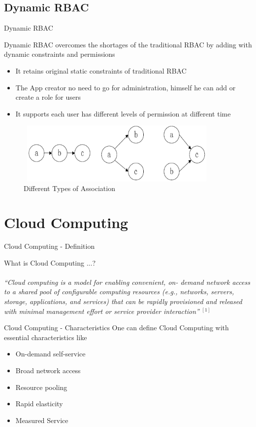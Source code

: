 \documentclass[xcolor=dvipsnames]{beamer}
\begin{document}
\subsection{Dynamic RBAC}
\begin{frame}{Dynamic RBAC}


Dynamic RBAC overcomes the shortages of the traditional RBAC by adding with dynamic constraints and  permissions
\begin{itemize}
 \item It retains original static constraints of traditional RBAC
 \item The App creator no need to go for administration, himself he can add or create a role for users
 \item It supports each user has different levels of permission at different time
\end{itemize}
\begin{figure}[H]
\includegraphics[width=10cm,height=3cm]{ass}
\caption{Different Types of Association}
\end{figure}
\end{frame}
\section{Cloud Computing}
\begin{frame}{Cloud Computing - Definition }

What is Cloud Computing ...? \\
\hspace{4cm} \\
\textit{``Cloud computing is a model for enabling convenient, on-
demand network access to a shared pool of configurable
computing resources (e.g., networks, servers, storage,
applications, and services) that can be rapidly provisioned
and released with minimal management effort or service
provider interaction''} $ ^{[1]} $

\end{frame}

\begin{frame} {Cloud Computing - Characteristics }
One can define Cloud Computing with essential characteristics like

\begin{itemize}
\item On-demand self-service
\item Broad network access
\item Resource pooling
\item Rapid elasticity
\item Measured Service
\end{itemize}
\end{frame}
\end{document}

